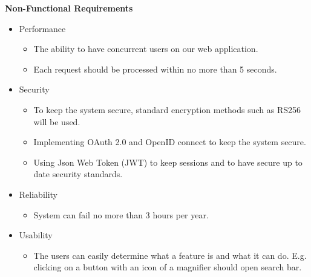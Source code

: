 \begin{justify}
    \noindent \textbf{Non-Functional Requirements}
    \begin{itemize}
        \item Performance
            \begin{itemize}
                \item The ability to have concurrent users on our web application.
                \item Each request should be processed within no more than 5 seconds.
            \end{itemize}
        \item Security
            \begin{itemize}
                \item To keep the system secure, standard encryption methods such as RS256 will be used.
                \item Implementing OAuth 2.0 and OpenID connect to keep the system secure.
                \item Using Json Web Token (JWT) to keep sessions and to have secure up to date security standards.
            \end{itemize}
        \item Reliability
            \begin{itemize}
                \item System can fail no more than 3 hours per year.
            \end{itemize}
        \item Usability
            \begin{itemize}
                \item The users can easily determine what a feature is and what it can do. E.g. clicking on a button with an icon of a magnifier should open search bar.\\
            \end{itemize}
    \end{itemize}
\end{justify}

\clearpage

